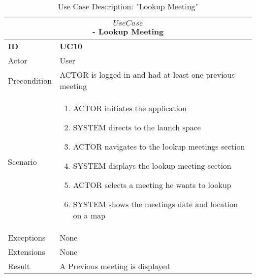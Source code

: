 \begin{center}
    \vspace{5mm}
    \begin{table}[H]
        \begin{tabular}{ |p{2cm}||p{11cm}| }
            \hline
            \multicolumn{2}{|c|}{$$Use Case$$ - Lookup Meeting} \\ \hline
            \textbf{ID} & \textbf{UC10} \\ \hline
            Actor & User \\ \hline
            Precondition & ACTOR is logged in and had at least one previous meeting \\ \hline
            Scenario &
            \begin{enumerate}
                \item ACTOR initiates the application
                \item SYSTEM directs to the launch space
                \item ACTOR navigates to the lookup meetings section
                \item SYSTEM displays the lookup meeting section
                \item ACTOR selects a meeting he wants to lookup
                \item SYSTEM shows the meetings date and location on a map
            \end{enumerate}
            \\ \hline 
            Exceptions & None \\ \hline
            Extensions & None \\ \hline
            Result & A Previous meeting is displayed \\ \hline
        \end{tabular}
        \caption{Use Case Description: "Lookup Meeting"}
    \end{table}
    
    \end{center}